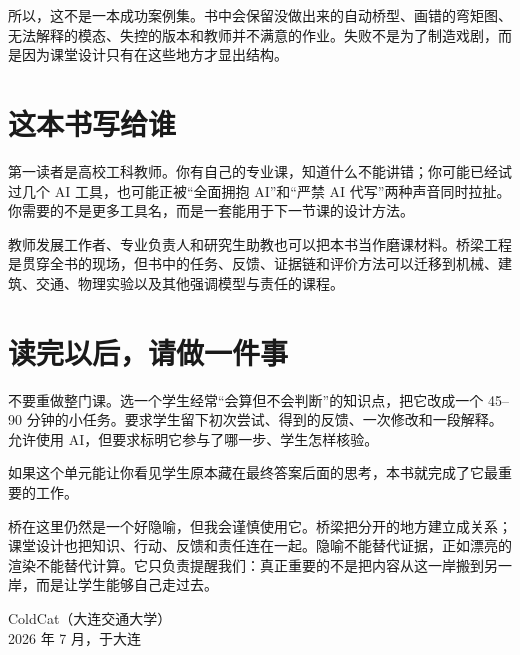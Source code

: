 所以，这不是一本成功案例集。书中会保留没做出来的自动桥型、画错的弯矩图、无法解释的模态、失控的版本和教师并不满意的作业。失败不是为了制造戏剧，而是因为课堂设计只有在这些地方才显出结构。

\section*{这本书写给谁}

第一读者是高校工科教师。你有自己的专业课，知道什么不能讲错；你可能已经试过几个 AI 工具，也可能正被“全面拥抱 AI”和“严禁 AI 代写”两种声音同时拉扯。你需要的不是更多工具名，而是一套能用于下一节课的设计方法。

教师发展工作者、专业负责人和研究生助教也可以把本书当作磨课材料。桥梁工程是贯穿全书的现场，但书中的任务、反馈、证据链和评价方法可以迁移到机械、建筑、交通、物理实验以及其他强调模型与责任的课程。

\section*{读完以后，请做一件事}

不要重做整门课。选一个学生经常“会算但不会判断”的知识点，把它改成一个 45--90 分钟的小任务。要求学生留下初次尝试、得到的反馈、一次修改和一段解释。允许使用 AI，但要求标明它参与了哪一步、学生怎样核验。

如果这个单元能让你看见学生原本藏在最终答案后面的思考，本书就完成了它最重要的工作。

桥在这里仍然是一个好隐喻，但我会谨慎使用它。桥梁把分开的地方建立成关系；课堂设计也把知识、行动、反馈和责任连在一起。隐喻不能替代证据，正如漂亮的渲染不能替代计算。它只负责提醒我们：真正重要的不是把内容从这一岸搬到另一岸，而是让学生能够自己走过去。

\begin{flushright}
ColdCat（大连交通大学）\\
2026 年 7 月，于大连
\end{flushright}
